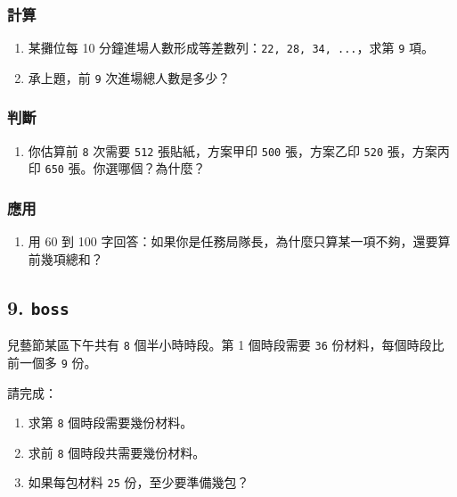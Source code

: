 \documentclass[
  chinese,
  12pt,
  a4paper,
  oneside]{article}
\providecommand{\tightlist}{%
  \setlength{\itemsep}{0pt}\setlength{\parskip}{0pt}}
\begin{document}
\subsubsection{計算}\label{ux8a08ux7b97}

\begin{enumerate}
\def\labelenumi{\arabic{enumi}.}
\setcounter{enumi}{2}
\tightlist
\item
  某攤位每 10
  分鐘進場人數形成等差數列：\texttt{22,\ 28,\ 34,\ ...}，求第 \texttt{9}
  項。
\item
  承上題，前 \texttt{9} 次進場總人數是多少？
\end{enumerate}

\subsubsection{判斷}\label{ux5224ux65b7}

\begin{enumerate}
\def\labelenumi{\arabic{enumi}.}
\setcounter{enumi}{4}
\tightlist
\item
  你估算前 \texttt{8} 次需要 \texttt{512} 張貼紙，方案甲印 \texttt{500}
  張，方案乙印 \texttt{520} 張，方案丙印 \texttt{650}
  張。你選哪個？為什麼？
\end{enumerate}

\subsubsection{應用}\label{ux61c9ux7528}

\begin{enumerate}
\def\labelenumi{\arabic{enumi}.}
\setcounter{enumi}{5}
\tightlist
\item
  用 60 到 100
  字回答：如果你是任務局隊長，為什麼只算某一項不夠，還要算前幾項總和？
\end{enumerate}

\subsection{\texorpdfstring{9. \texttt{boss}}{9. boss}}\label{boss}

兒藝節某區下午共有 \texttt{8} 個半小時時段。第 1 個時段需要 \texttt{36}
份材料，每個時段比前一個多 \texttt{9} 份。

請完成：

\begin{enumerate}
\def\labelenumi{\arabic{enumi}.}
\tightlist
\item
  求第 \texttt{8} 個時段需要幾份材料。
\item
  求前 \texttt{8} 個時段共需要幾份材料。
\item
  如果每包材料 \texttt{25} 份，至少要準備幾包？
\end{enumerate}
\end{document}
